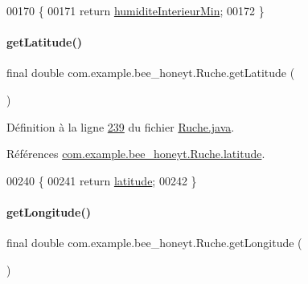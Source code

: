 \begin{DoxyCode}
00170     \{
00171         \textcolor{keywordflow}{return} \hyperlink{classcom_1_1example_1_1bee__honeyt_1_1_ruche_ab8234d1bae28a10622b331d3b773445d}{humiditeInterieurMin};
00172     \}
\end{DoxyCode}
\mbox{\label{classcom_1_1example_1_1bee__honeyt_1_1_ruche_a1e291ebb5c69c90fa5b6b7fafe09820e}} 
\paragraph{\texorpdfstring{get\+Latitude()}{getLatitude()}}
{\footnotesize\ttfamily final double com.\+example.\+bee\+\_\+honeyt.\+Ruche.\+get\+Latitude (\begin{DoxyParamCaption}{ }\end{DoxyParamCaption})}



Définition à la ligne \hyperlink{_ruche_8java_source_l00239}{239} du fichier \hyperlink{_ruche_8java_source}{Ruche.\+java}.



Références \hyperlink{_ruche_8java_source_l00036}{com.\+example.\+bee\+\_\+honeyt.\+Ruche.\+latitude}.


\begin{DoxyCode}
00240     \{
00241         \textcolor{keywordflow}{return} \hyperlink{classcom_1_1example_1_1bee__honeyt_1_1_ruche_a6a75dfabd9812334d502756f91fa4aa9}{latitude};
00242     \}
\end{DoxyCode}
\mbox{\label{classcom_1_1example_1_1bee__honeyt_1_1_ruche_a8a460b9473646a05668426a57e9773cb}} 
\paragraph{\texorpdfstring{get\+Longitude()}{getLongitude()}}
{\footnotesize\ttfamily final double com.\+example.\+bee\+\_\+honeyt.\+Ruche.\+get\+Longitude (\begin{DoxyParamCaption}{ }\end{DoxyParamCaption})}



